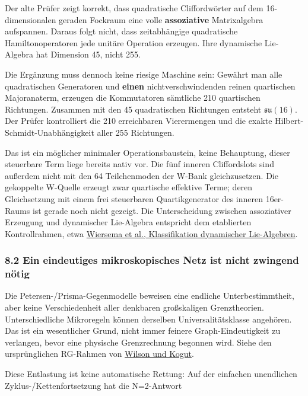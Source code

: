 Der alte Prüfer  zeigt korrekt,
dass quadratische Cliffordwörter auf dem 16-dimensionalen geraden
Fockraum eine volle \textbf{assoziative} Matrixalgebra aufspannen.
Daraus folgt nicht, dass zeitabhängige quadratische Hamiltonoperatoren
jede unitäre Operation erzeugen. Ihre dynamische Lie-Algebra hat
Dimension 45, nicht 255.

Die Ergänzung muss dennoch keine riesige Maschine sein: Gewährt man alle
quadratischen Generatoren und \textbf{einen} nichtverschwindenden reinen
quartischen Majoranaterm, erzeugen die Kommutatoren sämtliche 210
quartischen Richtungen. Zusammen mit den 45 quadratischen Richtungen
entsteht \(\mathfrak{su}(16)\). Der Prüfer kontrolliert die 210
erreichbaren Vierermengen und die exakte Hilbert-Schmidt-Unabhängigkeit
aller 255 Richtungen.

Das ist ein möglicher minimaler Operationsbaustein, keine Behauptung,
dieser steuerbare Term liege bereits nativ vor. Die fünf inneren
Cliffordslots sind außerdem nicht mit den 64 Teilchenmoden der W-Bank
gleichzusetzen. Die gekoppelte W-Quelle erzeugt zwar quartische
effektive Terme; deren Gleichsetzung mit einem frei steuerbaren
Quartikgenerator des inneren 16er-Raums ist gerade noch nicht gezeigt.
Die Unterscheidung zwischen assoziativer Erzeugung und dynamischer
Lie-Algebra entspricht dem etablierten Kontrollrahmen, etwa
\href{https://doi.org/10.1038/s41534-024-00900-2}{Wiersema et al.,
Klassifikation dynamischer Lie-Algebren}.

\subsubsection{8.2 Ein eindeutiges mikroskopisches Netz ist nicht
zwingend
nötig}\label{ein-eindeutiges-mikroskopisches-netz-ist-nicht-zwingend-nuxf6tig}

Die Petersen-/Prisma-Gegenmodelle beweisen eine endliche
Unterbestimmtheit, aber keine Verschiedenheit aller denkbaren
großskaligen Grenztheorien. Unterschiedliche Mikroregeln können
derselben Universalitätsklasse angehören. Das ist ein wesentlicher
Grund, nicht immer feinere Graph-Eindeutigkeit zu verlangen, bevor eine
physische Grenzrechnung begonnen wird. Siehe den ursprünglichen
RG-Rahmen von
\href{https://theory.tifr.res.in/~tridib/ReferenceMaterial/WilsonKogut.pdf}{Wilson
und Kogut}.

Diese Entlastung ist keine automatische Rettung: Auf der einfachen
unendlichen Zyklus-/Kettenfortsetzung hat die N=2-Antwort

